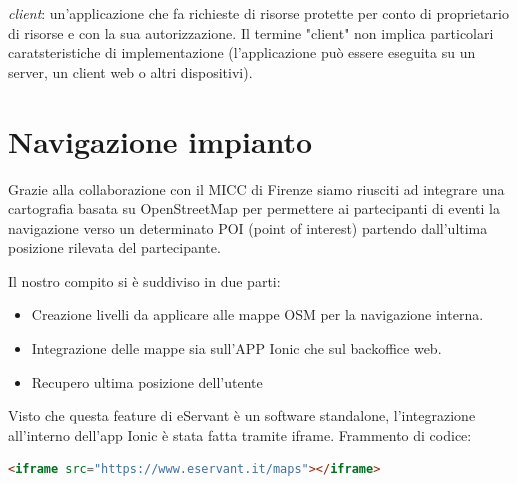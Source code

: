 \textit{client}: un'applicazione che fa richieste di risorse protette per conto di
proprietario di risorse e con la sua autorizzazione. Il termine "client"
non implica particolari caratsteristiche di implementazione (l'applicazione può essere eseguita
su un server, un client web o altri dispositivi).


\section{Navigazione impianto}
Grazie alla collaborazione con il MICC di Firenze siamo riusciti ad integrare una cartografia basata su OpenStreetMap
per permettere ai partecipanti di eventi la navigazione verso un determinato POI (point of interest) partendo
dall'ultima posizione rilevata del partecipante.

Il nostro compito si è suddiviso in due parti:
\begin{itemize}
\item Creazione livelli da applicare alle mappe OSM per la navigazione interna.
\item Integrazione delle mappe sia sull'APP Ionic che sul backoffice web.
\item Recupero ultima posizione dell'utente
\end{itemize}

Visto che questa feature di eServant è un software standalone, l'integrazione all'interno dell'app Ionic è stata fatta
tramite iframe.
Frammento di codice:
\begin{lstlisting}[language=html]
<iframe src="https://www.eservant.it/maps"></iframe>
\end{lstlisting}

\paragraph{}

